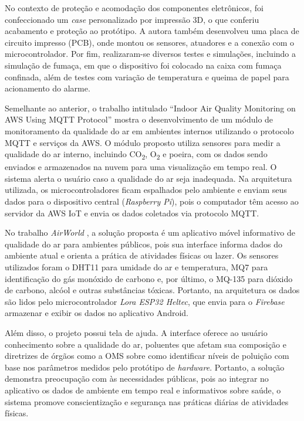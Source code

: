 No contexto de proteção e acomodação dos componentes eletrônicos, foi confeccionado um \textit{case} personalizado por impressão 3D, o que conferiu acabamento 
e proteção ao protótipo. A autora também desenvolveu uma placa de circuito impresso (PCB), onde montou os sensores, atuadores e a conexão com o microcontrolador. Por fim, realizaram-se 
diversos testes e simulações, incluindo a simulação de fumaça, em que o dispositivo foi colocado na caixa com fumaça confinada, além de testes com variação de temperatura e queima de papel para acionamento do alarme. 

Semelhante ao anterior, o trabalho intitulado ``Indoor Air Quality Monitoring on AWS Using MQTT Protocol'' \cite{iot-monitoring-on-aws} mostra o desenvolvimento de um módulo de monitoramento da qualidade do ar 
em ambientes internos utilizando o protocolo MQTT e serviços da AWS. O módulo proposto utiliza sensores para medir a qualidade do ar interno, incluindo CO\textsubscript{2}, O\textsubscript{2} e poeira, com os dados sendo enviados e armazenados na 
nuvem para uma visualização em tempo real. O sistema alerta o usuário caso a qualidade do ar seja inadequada. Na arquitetura utilizada, os microcontroladores ficam espalhados 
pelo ambiente e enviam seus dados para o dispositivo central (\textit{Raspberry Pi}), pois o computador têm acesso ao servidor da AWS IoT e envia os dados coletados via protocolo MQTT.

No trabalho \textit{AirWorld} \cite{UFAMAirWorld}, a solução proposta é um aplicativo móvel informativo de qualidade do ar para ambientes públicos, pois 
sua interface informa dados do ambiente atual e orienta a prática de atividades físicas ou lazer. Os sensores utilizados foram o DHT11 para umidade do ar e temperatura, MQ7 para identificação do gás monóxido de 
carbono e, por último, o MQ-135 para dióxido de carbono, alcóol e outras substâncias tóxicas. Portanto, na arquitetura os dados são lidos pelo microcontrolador 
\textit{Lora ESP32 Heltec}, que envia para o \textit{Firebase} armazenar e exibir os dados no aplicativo Android. 

Além disso, o projeto possui tela de ajuda. A interface oferece ao usuário conhecimento sobre a qualidade do ar, poluentes que afetam sua composição e diretrizes de órgãos como a OMS sobre 
como identificar níveis de poluição com base nos parâmetros medidos pelo protótipo de \textit{hardware}. Portanto, a solução demonstra preocupação com às necessidades públicas, pois ao integrar 
no aplicativo os dados de ambiente em tempo real e informativos sobre saúde, o sistema promove conscientização e segurança nas práticas diárias de atividades físicas.

